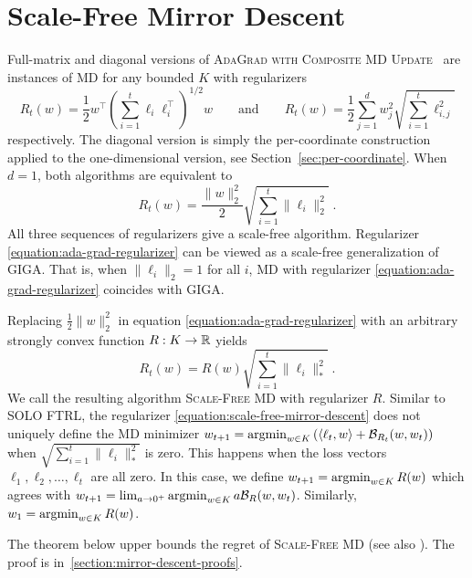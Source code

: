 \section{Scale-Free Mirror Descent}
\label{section:mirror-descent}

Full-matrix and diagonal versions of \textsc{AdaGrad with Composite MD
Update}~\cite{Duchi-Hazan-Singer-2011} are instances of \textsc{MD} for any
bounded $K$ with regularizers
$$
R_t(w) = \frac{1}{2} w^\top \left(\sum_{i=1}^t \ell_i \ell_i^\top \right)^{1/2} \!\!\!\! w
\qquad \text{and} \qquad
R_t(w) = \frac{1}{2} \sum_{j=1}^d w_j^2 \sqrt{ \sum_{i=1}^t \ell_{i,j}^2}
$$
respectively. The diagonal version is simply the per-coordinate construction
applied to the one-dimensional version, see Section~\ref{sec:per-coordinate}. When $d=1$, both algorithms are
equivalent to
\begin{equation}
\label{equation:ada-grad-regularizer}
R_t(w) = \frac{\|w\|_2^2}{2} \sqrt{\sum_{i=1}^t \|\ell_i\|_2^2 } \; .
\end{equation}
All three sequences of regularizers give a scale-free algorithm. Regularizer
\eqref{equation:ada-grad-regularizer} can be viewed as a scale-free
generalization of GIGA. That is, when $\|\ell_i\|_2
= 1$ for all $i$, \textsc{MD} with regularizer
\eqref{equation:ada-grad-regularizer} coincides with GIGA.

Replacing $\frac{1}{2}\|w\|_2^2$ in equation
\eqref{equation:ada-grad-regularizer} with an arbitrary strongly convex
function $R:K \to \mathbb{R}$ yields
\begin{equation}
\label{equation:scale-free-mirror-descent}
R_t(w) = R(w) \sqrt{\sum_{i=1}^t \|\ell_i\|_*^2} \; .
\end{equation}
We call the resulting algorithm \textsc{Scale-Free MD} with
regularizer $R$. Similar to \textsc{SOLO FTRL}, the regularizer
\eqref{equation:scale-free-mirror-descent} does not uniquely define
the \textsc{MD} minimizer
$w_{t+1} = \operatorname*{argmin}_{w \in K} \left(\langle \ell_t, w \rangle + \mathcal{B}_{R_t}(w,
w_t) \right)$ when $\sqrt{\sum_{i=1}^t \|\ell_i\|_*^2}$ is zero.
This happens when the loss vectors $\ell_1, \ell_2, \dots, \ell_t$ are all
zero. In this case, we define
$w_{t+1} = \operatorname*{argmin}_{w \in K} R(w)$ which agrees with
$w_{t+1} = \lim_{a \to 0^+} \operatorname*{argmin}_{w \in K} a \mathcal{B}_{R}(w, w_t)$.
Similarly, $w_1 = \operatorname*{argmin}_{w \in K} R(w)$.

The theorem below upper bounds the regret of \textsc{Scale-Free MD} (see also
\cite{Duchi-Hazan-Singer-2011, Duchi-Shalev-Shwartz-Singer-Tewari-2010,
Rakhlin-Sridharan-2013}).  The proof is in~\ref{section:mirror-descent-proofs}.

